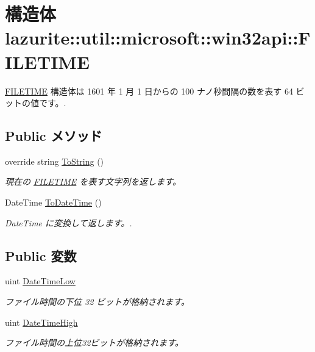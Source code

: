 \hypertarget{structlazurite_1_1util_1_1microsoft_1_1win32api_1_1_f_i_l_e_t_i_m_e}{
\section{構造体 lazurite::util::microsoft::win32api::FILETIME}
\label{structlazurite_1_1util_1_1microsoft_1_1win32api_1_1_f_i_l_e_t_i_m_e}
}


\hyperlink{structlazurite_1_1util_1_1microsoft_1_1win32api_1_1_f_i_l_e_t_i_m_e}{FILETIME} 構造体は 1601 年 1 月 1 日からの 100 ナノ秒間隔の数を表す 64 ビットの値です。.  
\subsection*{Public メソッド}
\begin{DoxyCompactItemize}
\item 
override string \hyperlink{structlazurite_1_1util_1_1microsoft_1_1win32api_1_1_f_i_l_e_t_i_m_e_a60e10d02bb318f08df009efb372cc799}{ToString} ()
\begin{DoxyCompactList}\small\item\em 現在の \hyperlink{structlazurite_1_1util_1_1microsoft_1_1win32api_1_1_f_i_l_e_t_i_m_e}{FILETIME} を表す文字列を返します。 \item\end{DoxyCompactList}\item 
DateTime \hyperlink{structlazurite_1_1util_1_1microsoft_1_1win32api_1_1_f_i_l_e_t_i_m_e_a485d3625eb0f98f02fa762b65b2c8456}{ToDateTime} ()
\begin{DoxyCompactList}\small\item\em DateTime に変換して返します。. \item\end{DoxyCompactList}\end{DoxyCompactItemize}
\subsection*{Public 変数}
\begin{DoxyCompactItemize}
\item 
uint \hyperlink{structlazurite_1_1util_1_1microsoft_1_1win32api_1_1_f_i_l_e_t_i_m_e_ae3a6f99e4acb1756d2a42195408bb8ad}{DateTimeLow}
\begin{DoxyCompactList}\small\item\em ファイル時間の下位 32 ビットが格納されます。 \item\end{DoxyCompactList}\item 
uint \hyperlink{structlazurite_1_1util_1_1microsoft_1_1win32api_1_1_f_i_l_e_t_i_m_e_aa23b42111459c4b9cabc53f411b84aa3}{DateTimeHigh}
\begin{DoxyCompactList}\small\item\em ファイル時間の上位32ビットが格納されます。 \item\end{DoxyCompactList}\end{DoxyCompactItemize}


